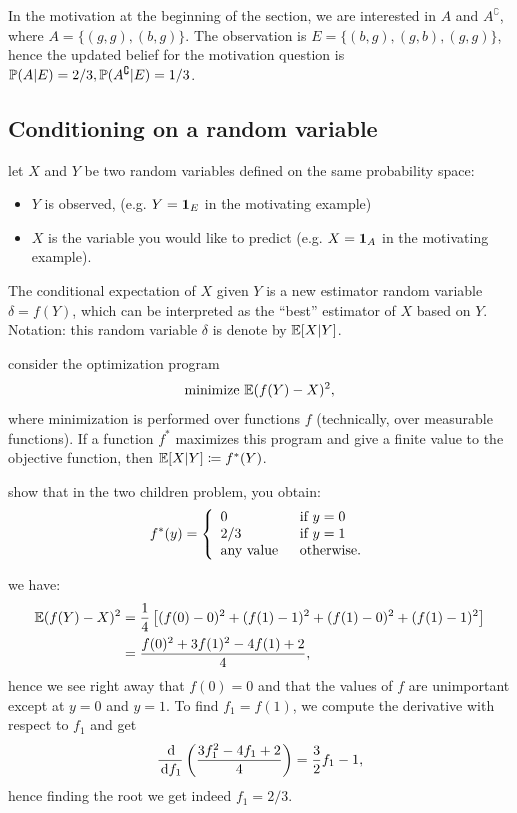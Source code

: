 \documentclass{article}
\begin{document}
 In the motivation at the beginning of the section, we are interested in $A$ and $A^\complement$, where $A = \{(g,g), (b,g)\}$. The observation is $E = \{(b,g),(g,b),(g,g)\}$, hence the updated belief for the motivation question is $\P(A|E) = 2/3, \P(A^\complement|E) = 1/3$.


\subsection{Conditioning on a random variable}

 let $X$ and $Y$ be two random variables defined on the same probability space:
\begin{itemize}
  \item $Y$ is observed, (e.g. $Y = \1_E$ in the motivating example)
  \item $X$ is the variable you would like to predict (e.g. $X = \1_A$ in the motivating example).
\end{itemize}
The conditional expectation of $X$ given $Y$ is a new estimator random variable $\delta = f(Y)$, which can be interpreted as the ``best'' estimator of $X$ based on $Y$. Notation: this random variable $\delta$ is denote by $\E[X|Y]$.

 consider the optimization program
\[ \text{minimize}\ \E(f(Y) - X)^2, \]
where minimization is performed over functions $f$ (technically, over measurable functions). If a function $f^*$ maximizes this program and give a finite value to the objective function, then $\E[X|Y] \defeq f^*(Y)$.

 show that in the two children problem, you obtain:
\[ f^*(y) = \bracearraycond{0 \;\;&\text{if }y=0\\ 2/3\;\;&\text{if }y=1\\\text{any value}\;\;&\text{otherwise.}} \] 

 we have:
\begin{align*} \E(f(Y) - X)^2 &= \frac{1}{4}\left[ (f(0) - 0)^2 + (f(1) - 1)^2 + (f(1) - 0)^2 + (f(1) - 1)^2 \right] \\ 
&= \frac{f(0)^2 + 3 f(1)^2 - 4f(1) +2}{4},
\end{align*}
hence we see right away that $f(0) = 0$ and that the values of $f$ are unimportant except at $y=0$ and $y=1$. To find $f_1 = f(1)$, we compute the derivative with respect to $f_1$ and get
\[ \frac{\ud}{\ud f_1} \left(  \frac{3 f_1^2 - 4 f_1 +2}{4}\right) = \frac{3}{2} f_1 - 1, \]
hence finding the root we get indeed $f_1 = 2/3$.
\end{document}
